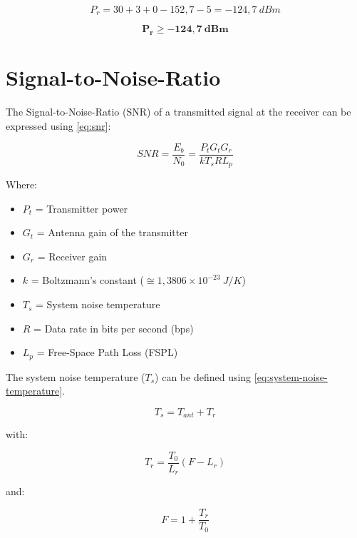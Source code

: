 \begin{equation}
    P_{r} = 30 + 3 + 0 - 152,7 - 5 = -124,7\ dBm
\end{equation}

\begin{equation}
    \mathbf{P_{r} \geq -124,7\ dBm}
\end{equation}

\section{Signal-to-Noise-Ratio}

The Signal-to-Noise-Ratio (SNR) of a transmitted signal at the receiver can be expressed using \autoref{eq:snr}:

\begin{equation} \label{eq:snr}
    SNR = \frac{E_{b}}{N_{0}} = \frac{P_{t}G_{t}G_{r}}{kT_{s}RL_{p}}
\end{equation}

Where:

\begin{itemize}
    \item $P_{t}$ = Transmitter power
    \item $G_{t}$ = Antenna gain of the transmitter
    \item $G_{r}$ = Receiver gain
    \item $k$ = Boltzmann's constant ($\cong 1,3806 \times 10^{-23}\ J/K$)
    \item $T_{s}$ = System noise temperature
    \item $R$ = Data rate in bits per second (bps)
    \item $L_{p}$ = Free-Space Path Loss (FSPL)
\end{itemize}

The system noise temperature ($T_{s}$) can be defined using \autoref{eq:system-noise-temperature}.

\begin{equation} \label{eq:system-noise-temperature}
    T_{s} = T_{ant} + T_{r}
\end{equation}

with:

\begin{equation} \label{eq:noise-temperature-receiver}
    T_{r} = \frac{T_{0}}{L_{r}} (F - L_{r})
\end{equation}

and:

\begin{equation} \label{eq:noise-figure}
    F = 1 + \frac{T_{r}}{T_{0}}
\end{equation}

